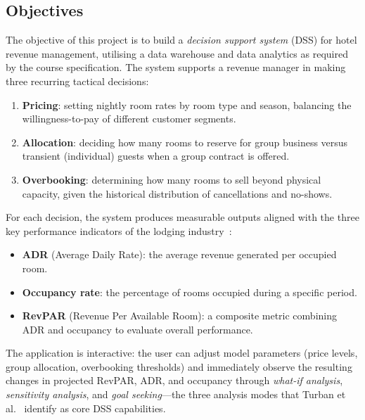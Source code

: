 \subsection{Objectives}

The objective of this project is to build a \emph{decision support system} (DSS) for hotel revenue management, utilising a data warehouse and data analytics as required by the course specification. The system supports a revenue manager in making three recurring tactical decisions:

\begin{enumerate}
  \item \textbf{Pricing}: setting nightly room rates by room type and season, balancing the willingness-to-pay of different customer segments.
  \item \textbf{Allocation}: deciding how many rooms to reserve for group business versus transient (individual) guests when a group contract is offered.
  \item \textbf{Overbooking}: determining how many rooms to sell beyond physical capacity, given the historical distribution of cancellations and no-shows.
\end{enumerate}

For each decision, the system produces measurable outputs aligned with the three key performance indicators of the lodging industry~\cite{goeldner2009}:
\begin{itemize}
  \item \textbf{ADR} (Average Daily Rate): the average revenue generated per occupied room.
  \item \textbf{Occupancy rate}: the percentage of rooms occupied during a specific period.
  \item \textbf{RevPAR} (Revenue Per Available Room): a composite metric combining ADR and occupancy to evaluate overall performance.
\end{itemize}

The application is interactive: the user can adjust model parameters (price levels, group allocation, overbooking thresholds) and immediately observe the resulting changes in projected RevPAR, ADR, and occupancy through \emph{what-if analysis}, \emph{sensitivity analysis}, and \emph{goal seeking}---the three analysis modes that Turban et al.~\cite{turban2011} identify as core DSS capabilities.
